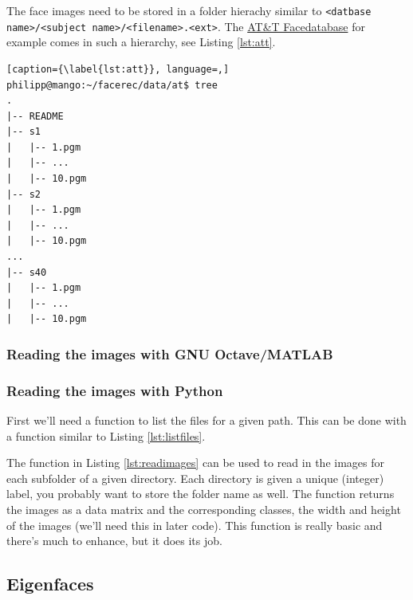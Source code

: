 The face images need to be stored in a folder hierachy similar to \lstinline|<datbase name>/<subject name>/<filename>.<ext>|. The \href{http://www.cl.cam.ac.uk/research/dtg/attarchive/facedatabase.html}{AT\&T Facedatabase} for example comes in such a hierarchy, see Listing \ref{lst:att}.

\begin{lstlisting}[caption={\label{lst:att}}, language=,]
philipp@mango:~/facerec/data/at$ tree
.
|-- README
|-- s1
|   |-- 1.pgm
|   |-- ...
|   |-- 10.pgm
|-- s2
|   |-- 1.pgm
|   |-- ...
|   |-- 10.pgm
...
|-- s40
|   |-- 1.pgm
|   |-- ...
|   |-- 10.pgm
\end{lstlisting}

\ifx\python\undefined 
\subsubsection{Reading the images with GNU Octave/MATLAB}
\else
\subsubsection{Reading the images with Python}
\fi


\ifx\python\undefined
	First we'll need a function to list the files for a given path. This can be done with a function similar to Listing \ref{lst:listfiles}.

	
\fi

The function in Listing \ref{lst:readimages} can be used to read in the images for each subfolder of a given directory. Each directory is given a unique (integer) label, you probably want to store the folder name as well. The function returns the images\ifx\python\undefined{} as a data matrix\fi{} and the corresponding classes\ifx\python\undefined, the width and height of the images (we'll need this in later code)\fi{}. This function is really basic and there's much to enhance, but it does its job.

\ifx\python\undefined
	
\else
	
\fi


\subsection{Eigenfaces}

